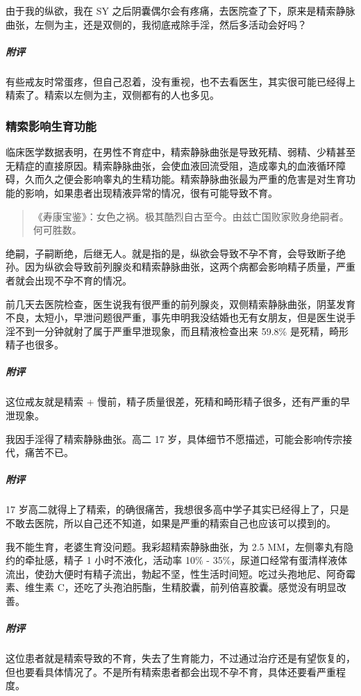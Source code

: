 \begin{case}[精索静脉曲张]
    由于我的纵欲，我在 SY 之后阴囊偶尔会有疼痛，去医院查了下，原来是精索静脉曲张，左侧为主，还是双侧的，我彻底戒除手淫，然后多活动会好吗？
    \subparagraph{附评} 有些戒友时常蛋疼，但自己忍着，没有重视，也不去看医生，其实很可能已经得上精索了。精索以左侧为主，双侧都有的人也多见。
\end{case}

\subsubsection{精索影响生育功能}

临床医学数据表明，在男性不育症中，精索静脉曲张是导致死精、弱精、少精甚至无精症的直接原因。精索静脉曲张，会使血液回流受阻，造成睾丸的血液循环障碍，久而久之便会影响睾丸的生精功能。精索静脉曲张最为严重的危害是对生育功能的影响，如果患者出现精液异常的情况，很有可能导致不育。

\begin{quote}
    《寿康宝鉴》：女色之祸。极其酷烈自古至今。由兹亡国败家败身绝嗣者。何可胜数。
\end{quote}

绝嗣，子嗣断绝，后继无人。就是指的是，纵欲会导致不孕不育，会导致断子绝孙。因为纵欲会导致前列腺炎和精索静脉曲张，这两个病都会影响精子质量，严重者就会出现不孕不育的情况。

\begin{case}[精索静脉曲张]
    前几天去医院检查，医生说我有很严重的前列腺炎，双侧精索静脉曲张，阴茎发育不良，太短小，早泄问题很严重，事先申明我没结婚也无有女朋友，但是医生说手淫不到一分钟就射了属于严重早泄现象，而且精液检查出来 59.8\% 是死精，畸形精子也很多。
    \subparagraph{附评} 这位戒友就是精索 + 慢前，精子质量很差，死精和畸形精子很多，还有严重的早泄现象。
\end{case}

\begin{case}[精索静脉曲张]
    我因手淫得了精索静脉曲张。高二 17 岁，具体细节不愿描述，可能会影响传宗接代，痛苦不已。
    \subparagraph{附评} 17 岁高二就得上了精索，的确很痛苦，我想很多高中学子其实已经得上了，只是不敢去医院，所以自己还不知道，如果是严重的精索自己也应该可以摸到的。
\end{case}

\begin{case}[精索静脉曲张]
    我不能生育，老婆生育没问题。我彩超精索静脉曲张，为 2.5 MM，左侧睾丸有隐约的牵扯感，精子 1 小时不液化，活动率 10\% - 35\%，尿道口经常有蛋清样液体流出，使劲大便时有精子流出，勃起不坚，性生活时间短。吃过头孢地尼、阿奇霉素、维生素 C，还吃了头孢泊肟酯，生精胶囊，前列倍喜胶囊。感觉没有明显改善。
    \subparagraph{附评} 这位患者就是精索导致的不育，失去了生育能力，不过通过治疗还是有望恢复的，但也要看具体情况了。不是所有精索患者都会出现不孕不育，具体还要看严重程度。
\end{case}

